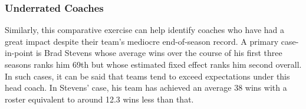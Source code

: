\documentclass[main.tex]{subfiles}
\begin{document}
\subsubsection{Underrated Coaches}

Similarly, this comparative exercise can help identify coaches who have had a great impact despite their team's mediocre end-of-season record. A primary case-in-point is Brad Stevens whose average wins over the course of his first three seasons ranks him 69th but whose estimated fixed effect ranks him second overall. In such cases, it can be said that teams tend to exceed expectations under this head coach. In Stevens' case, his team has achieved an average 38 wins with a roster equivalent to around 12.3 wins less than that. 

 
\end{document}
